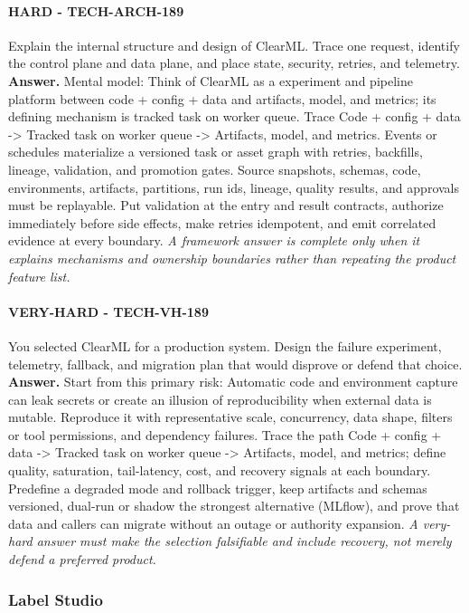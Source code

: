\paragraph{HARD - TECH-ARCH-189} Explain the internal structure and design of ClearML. Trace one request, identify the control plane and data plane, and place state, security, retries, and telemetry.
\textbf{Answer.} Mental model: Think of ClearML as a experiment and pipeline platform between code + config + data and artifacts, model, and metrics; its defining mechanism is tracked task on worker queue. Trace Code + config + data -> Tracked task on worker queue -> Artifacts, model, and metrics. Events or schedules materialize a versioned task or asset graph with retries, backfills, lineage, validation, and promotion gates. Source snapshots, schemas, code, environments, artifacts, partitions, run ids, lineage, quality results, and approvals must be replayable. Put validation at the entry and result contracts, authorize immediately before side effects, make retries idempotent, and emit correlated evidence at every boundary.
\textit{A framework answer is complete only when it explains mechanisms and ownership boundaries rather than repeating the product feature list.}
\paragraph{VERY-HARD - TECH-VH-189} You selected ClearML for a production system. Design the failure experiment, telemetry, fallback, and migration plan that would disprove or defend that choice.
\textbf{Answer.} Start from this primary risk: Automatic code and environment capture can leak secrets or create an illusion of reproducibility when external data is mutable. Reproduce it with representative scale, concurrency, data shape, filters or tool permissions, and dependency failures. Trace the path Code + config + data -> Tracked task on worker queue -> Artifacts, model, and metrics; define quality, saturation, tail-latency, cost, and recovery signals at each boundary. Predefine a degraded mode and rollback trigger, keep artifacts and schemas versioned, dual-run or shadow the strongest alternative (MLflow), and prove that data and callers can migrate without an outage or authority expansion.
\textit{A very-hard answer must make the selection falsifiable and include recovery, not merely defend a preferred product.}
\subsubsection*{Label Studio}
